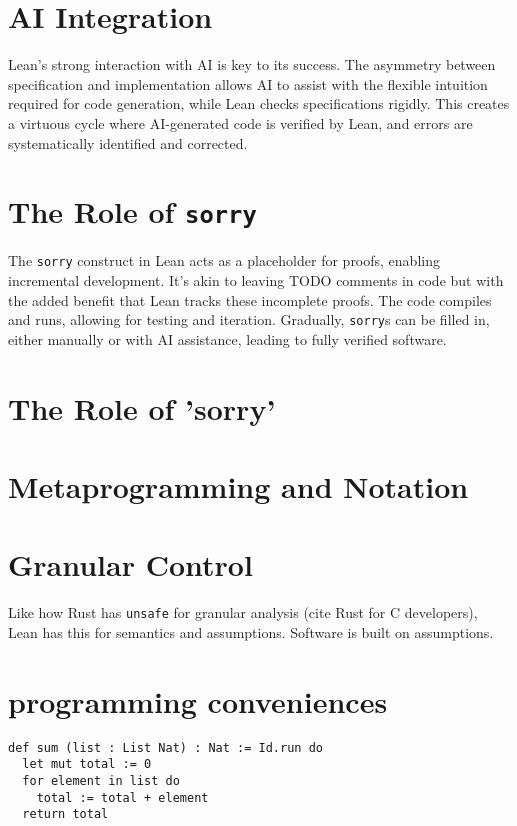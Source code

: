 \documentclass{article}
\begin{document}
\section{AI Integration}

Lean's strong interaction with AI is key to its success. The asymmetry between specification and implementation allows AI to assist with the flexible intuition required for code generation, while Lean checks specifications rigidly. This creates a virtuous cycle where AI-generated code is verified by Lean, and errors are systematically identified and corrected.

\section{The Role of \texttt{sorry}}

The \texttt{sorry} construct in Lean acts as a placeholder for proofs, enabling incremental development. It's akin to leaving TODO comments in code but with the added benefit that Lean tracks these incomplete proofs. The code compiles and runs, allowing for testing and iteration. Gradually, \texttt{sorry}s can be filled in, either manually or with AI assistance, leading to fully verified software.

\section{The Role of 'sorry'}

\section{Metaprogramming and Notation}

\section{Granular Control}
Like how Rust has \texttt{unsafe} for granular analysis (cite Rust for C developers),
Lean has this for semantics and assumptions. Software is built on assumptions.

\section{programming conveniences}

\begin{verbatim}
def sum (list : List Nat) : Nat := Id.run do
  let mut total := 0
  for element in list do
    total := total + element
  return total
\end{verbatim}
\end{document}
